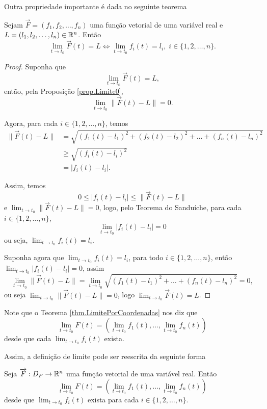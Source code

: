 Outra propriedade importante é dada no seguinte teorema

\begin{theorem}\label{thm.LimitePorCoordenadas}
    Sejam \(\overrightarrow{F} = (f_1,f_2,\dots,f_n)\) uma função vetorial de uma variável real e \(L = (l_1,l_2,\dots,l_n)\in\mathbb{R}^n\). Então \[\lim_{t\to t_0} \overrightarrow{F}(t) = L \Leftrightarrow \lim_{t\to t_0} f_i(t) = l_i,\; i\in\{1,2,\dots,n\}.\]
\end{theorem}

\begin{proof}
    Suponha que \[\lim_{t\to t_0} \overrightarrow{F}(t) = L,\] então, pela Proposição \ref{prop.Limite0}, \[\lim_{t\to t_0} \|\overrightarrow{F}(t) - L\| = 0.\]

    Agora, para cada \(i\in\{1,2,\dots,n\}\), temos
        \begin{align*}
            \|\overrightarrow{F}(t) - L\|
                & = \sqrt{(f_1(t) - l_1)^2 + (f_2(t) - l_2)^2 + \dots + (f_n(t) - l_n)^2} \\
                & \geq \sqrt{(f_i(t) - l_i)^2}\\
                & = |f_i(t) - l_i|.
        \end{align*}

    Assim, temos \[0 \leq |f_i(t) - l_i| \leq \|\overrightarrow{F}(t) - L\|\] e \(\lim_{t\to t_0} \|\overrightarrow{F}(t) - L\| = 0\), logo, pelo Teorema do Sanduíche, para cada \(i\in\{1,2,\dots,n\}\), \[\lim_{t\to t_0} |f_i(t) - l_i| = 0\] ou seja, \(\lim_{t\to t_0} f_i(t) = l_i\).

    Suponha agora que \(\lim_{t\to t_0} f_i(t) = l_i\), para todo \(i\in\{1,2,\dots,n\}\), então \(\lim_{t\to t_0} |f_i(t) - l_i| = 0\), assim \[\lim_{t\to t_0} \|\overrightarrow{F}(t) - L\| = \lim_{t\to t_0} \sqrt{(f_1(t) - l_1)^2 + \dots + (f_n(t) - l_n)^2} = 0,\] ou seja \(\lim_{t\to t_0} \|\overrightarrow{F}(t) - L\| = 0\), logo \(\lim_{t\to t_0} \overrightarrow{F}(t) = L\).
\end{proof}

Note que o Teorema \ref{thm.LimitePorCoordenadas} nos diz que \[\lim_{t\to t_0} F(t) = \left( \lim_{t\to t_0} f_1(t), \dots, \lim_{t\to t_0} f_n(t) \right)\] desde que cada \(\lim_{t\to t_0} f_i(t)\) exista. 

Assim, a definição de limite pode ser reescrita da seguinte forma

\begin{definition}
    Seja \(\overrightarrow{F}: D_F \to \mathbb{R}^n\) uma função vetorial de uma variável real. Então \[\lim_{t\to t_0} F(t) = \left( \lim_{t\to t_0} f_1(t), \dots, \lim_{t\to t_0} f_n(t) \right)\] desde que \(\lim_{t\to t_0} f_i(t)\) exista para cada \(i\in\{1,2,\dots,n\}\).
\end{definition}

